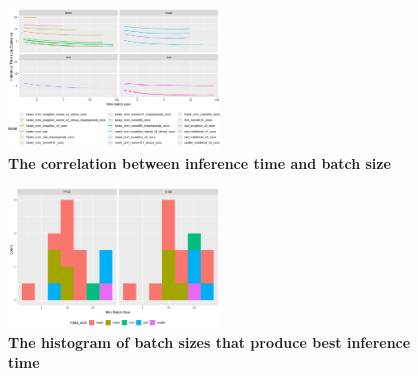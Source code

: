 \documentclass[conference]{IEEEtran}
\begin{document}
\begin{figure}[htpb]
	  \centering
	  \includegraphics[width=0.5\textwidth]{RunningVSBatch}
	  \caption{\textbf{The correlation between inference time and batch size}}
	  \label{fig:running-batch}
\end{figure}

\begin{figure}[htpb]
	  \centering
	  \includegraphics[width=0.5\textwidth]{BestBatch-DiffArch}
	  \caption{\textbf{The histogram of batch sizes that produce best inference time}}
	  \label{fig:bestbatch-diffarch}
\end{figure}

% 
% 
% 
% 
% 
% 
\end{document}
